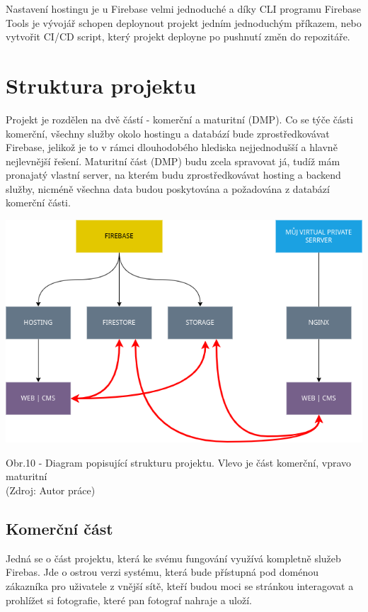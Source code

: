 \documentclass[12pt,a4paper]{report}
\begin{document}
  Nastavení hostingu je u Firebase velmi jednoduché a díky CLI programu Firebase Tools je vývojář schopen
  deploynout projekt jedním jednoduchým příkazem, nebo vytvořit CI/CD script, který projekt deployne po pushnutí změn do repozitáře. 

  \chapter{Struktura projektu}
  Projekt je rozdělen na dvě částí - komerční a maturitní (DMP). Co se týče části komerční, všechny
  služby okolo hostingu a databází bude zprostředkovávat Firebase, jelikož je to v rámci
  dlouhodobého hlediska nejjednodušší a hlavně nejlevnější řešení. Maturitní část (DMP) budu zcela
  spravovat já, tudíž mám pronajatý vlastní server, na kterém budu zprostředkovávat hosting a
  backend služby, nicméně všechna data budou poskytována a požadována z databází komerční
  části.
 
  \vspace*{0.5cm}
  \noindent\includegraphics[width=\linewidth]{project_structure.png}
  \begin{center}
    Obr.10 -  Diagram popisující strukturu projektu. Vlevo je část komerční, vpravo maturitní \\
    (Zdroj: Autor práce)
  \end{center}
  \vspace*{0.5cm}
  
  \section{Komerční část}
  Jedná se o část projektu, která ke svému fungování využívá kompletně služeb Firebas.
  Jde o ostrou verzi systému, která bude přístupná pod doménou zákazníka pro uživatele z vnější sítě, kteří budou moci se stránkou 
  interagovat a prohlížet si fotografie, které pan fotograf nahraje a uloží.
\end{document}
